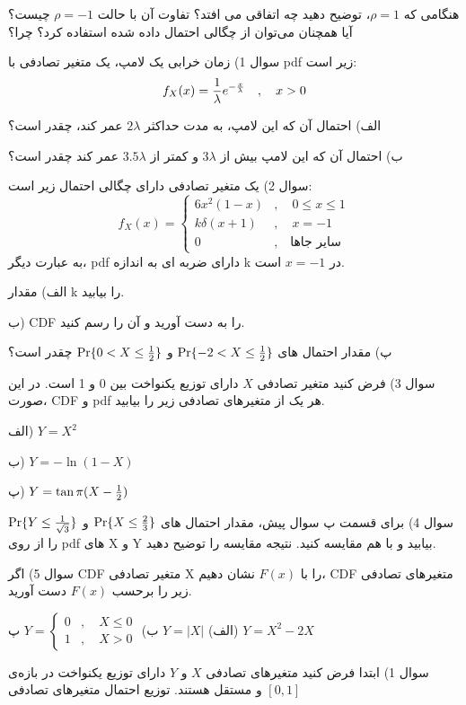\documentclass[10pt,letterpaper]{article}
\begin{document}
هنگامی که $\rho=1$، توضیح دهید چه اتفاقی می افتد؟ تفاوت آن با حالت $\rho=-1$ چیست؟ آیا همچنان می‌توان از چگالی احتمال داده شده استفاده کرد؟ چرا؟

سوال 1) زمان خرابی یک لامپ، یک متغیر تصادفی با pdf زیر است:
$$
f_X(x)={1\over\lambda}e^{-{x\over\lambda}}\quad,\quad x>0
$$

الف) احتمال آن که این لامپ، به مدت حداکثر
$
2\lambda
$
عمر کند، چقدر است؟

ب) احتمال آن که این لامپ بیش از 
$
3\lambda
$
و کمتر از 
$
3.5\lambda
$
عمر کند چقدر است؟

سوال 2) یک متغیر تصادفی دارای چگالی احتمال زیر است:
$$
f_X(x)=\begin{cases}
6x^2(1-x)&,\quad 0\le x\le1\\
k\delta(x+1)&,\quad x=-1\\
0&,\quad \text{سایر جاها}
\end{cases}
$$
به عبارت دیگر، pdf دارای ضربه ای به اندازه k در $x=-1$ است.

الف) مقدار k را بیابید.

ب) CDF را به دست آورید و آن را رسم کنید.

پ) مقدار احتمال های 
$
\Pr\{-2< X\le {1\over2}\}
$
و
$
\Pr\{0< X\le {1\over2}\}
$
چقدر است؟

سوال 3) فرض کنید متغیر تصادفی $X$ دارای توزیع یکنواخت بین 0 و 1 است. در این صورت، CDF و pdf هر یک از متغیرهای تصادفی زیر را بیابید.

الف)
$
Y=X^2
$

ب)
$
Y=-\ln (1-X)
$

پ)
$
Y=\tan\pi (X-{1\over 2})
$

سوال 4) برای قسمت پ سوال پیش، مقدار احتمال های 
$
\Pr\{X\le {2\over 3}\}
$
و
$
\Pr\{Y\le {1\over \sqrt3}\}
$
را از روی pdf های X و Y بیابید و با هم مقایسه کنید. نتیجه مقایسه را توضیح دهید.

سوال 5) اگر CDF متغیر تصادفی X را با $F(x)$ نشان دهیم، CDF متغیرهای تصادفی زیر را برحسب $F(x)$ دست آورید.

الف)
$
Y=|X|
$
\quad\quad\quad\quad\quad
ب)
$
Y=\begin{cases}
0&,\quad X\le0\\
1&,\quad X>0
\end{cases}
$
\quad\quad\quad\quad\quad
پ)
$
Y=X^2-2X
$

%
%
%
سوال 1) ابتدا فرض کنید متغیرهای تصادفی $X$ و $Y$ دارای توزیع یکنواخت در بازه‌ی $[0,1]$ و مستقل هستند. توزیع احتمال متغیرهای تصادفی 
\end{document}
